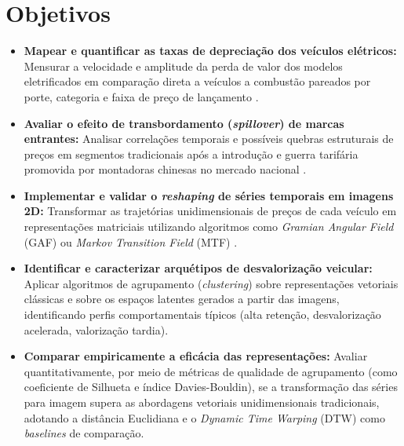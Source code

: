 \section{Objetivos}

\begin{itemize}
      \item \textbf{Mapear e quantificar as taxas de depreciação dos veículos elétricos:} Mensurar a velocidade e amplitude da perda de valor dos modelos eletrificados em comparação direta a veículos a combustão pareados por porte, categoria e faixa de preço de lançamento \cite{schloter2022empirical}.
      
      \item \textbf{Avaliar o efeito de transbordamento (\textit{spillover}) de marcas entrantes:} Analisar correlações temporais e possíveis quebras estruturais de preços em segmentos tradicionais após a introdução e guerra tarifária promovida por montadoras chinesas no mercado nacional \cite{li2026global, li2025rise}.

      \item \textbf{Implementar e validar o \textit{reshaping} de séries temporais em imagens 2D:} Transformar as trajetórias unidimensionais de preços de cada veículo em representações matriciais utilizando algoritmos como \textit{Gramian Angular Field} (GAF) ou \textit{Markov Transition Field} (MTF) \cite{wu2023imaging, jueco2024performance}.

      \item \textbf{Identificar e caracterizar arquétipos de desvalorização veicular:} Aplicar algoritmos de agrupamento (\textit{clustering}) sobre representações vetoriais clássicas e sobre os espaços latentes gerados a partir das imagens, identificando perfis comportamentais típicos (alta retenção, desvalorização acelerada, valorização tardia).

      \item \textbf{Comparar empiricamente a eficácia das representações:} Avaliar quantitativamente, por meio de métricas de qualidade de agrupamento (como coeficiente de Silhueta e índice Davies-Bouldin), se a transformação das séries para imagem supera as abordagens vetoriais unidimensionais tradicionais, adotando a distância Euclidiana e o \textit{Dynamic Time Warping} (DTW) como \textit{baselines} de comparação.
\end{itemize}
